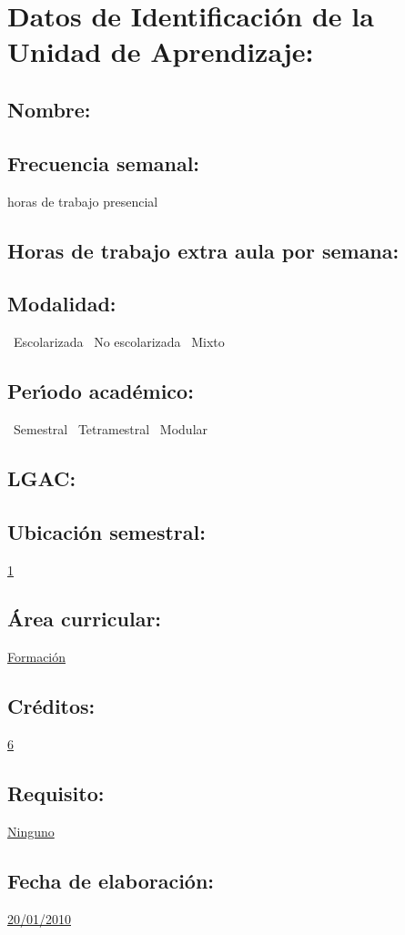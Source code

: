 \documentclass[10 pt]{article}
\begin{document}


\section{Datos de Identificaci\'{o}n de la Unidad de Aprendizaje:}
\subsection{Nombre:} 
\subsection{Frecuencia semanal:} horas de trabajo presencial 
\subsection{Horas de trabajo extra aula por semana:} 
\subsection{Modalidad:} \yes~Escolarizada \no~No escolarizada \no~Mixto
\subsection{Per\'{\i}odo acad\'{e}mico:} \yes~Semestral
\no~Tetramestral \no~Modular
\subsection{LGAC:} \underline{\odsi}
\subsection{Ubicaci\'{o}n semestral:} \underline{1}
\subsection{\'{A}rea curricular:} \underline{Formaci\'{o}n}
\subsection{Cr\'{e}ditos:} \underline{6}
\subsection{Requisito:} \underline{Ninguno}
\subsection{Fecha de elaboraci\'{o}n:} \underline{20/01/2010}
\end{document}
